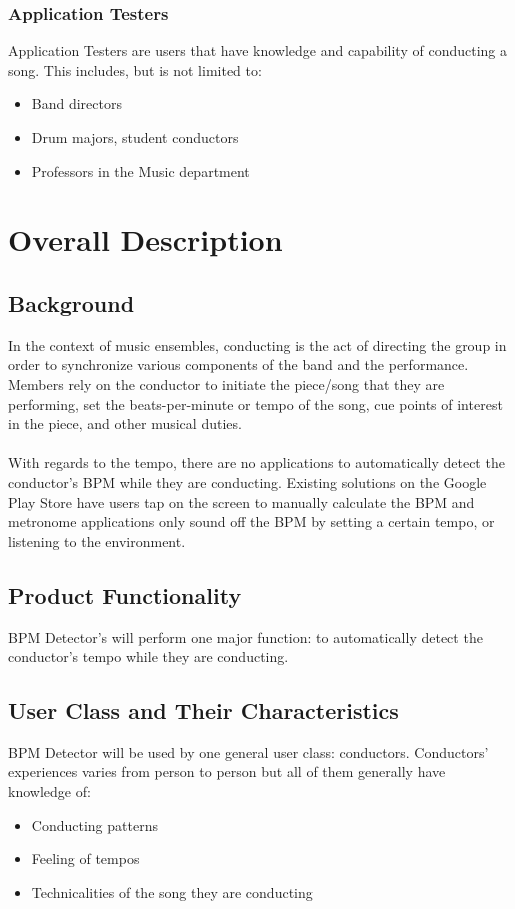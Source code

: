 \documentclass[12pt]{article}
\begin{document}
\subsubsection{Application Testers}
Application Testers are users that have knowledge and capability of conducting a song. This includes, but is not limited to:
\begin{itemize}
	\item Band directors
    \item Drum majors, student conductors
    \item Professors in the Music department
 \end{itemize}



\section{Overall Description}
\subsection{Background}
In the context of music ensembles, conducting is the act of directing the group in order to synchronize various components of the band and the performance. Members rely on the conductor to initiate the piece/song that they are performing, set the beats-per-minute or tempo of the song, cue points of interest in the piece, and other musical duties. 
\\
\\
With regards to the tempo, there are no applications to automatically detect the conductor's BPM while they are conducting. Existing solutions on the Google Play Store have users tap on the screen to manually calculate the BPM and metronome applications only sound off the BPM by setting a certain tempo, or listening to the environment.        

\subsection{Product Functionality}
BPM Detector's will perform one major function: to automatically detect the conductor's tempo while they are conducting.

\subsection{User Class and Their Characteristics}
BPM Detector will be used by one general user class: conductors. Conductors' experiences varies from person to person but all of them generally have knowledge of:
\begin{itemize}
	\item Conducting patterns
    \item Feeling of tempos
    \item Technicalities of the song they are conducting
 \end{itemize}
\end{document}
